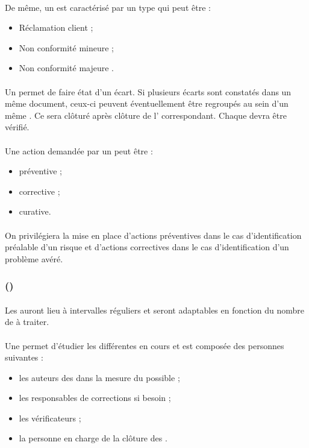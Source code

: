 \paragraph*{} De même, un \FTCourt{} est caractérisé par un type qui peut être :
\begin{itemize}
\item Réclamation client ;
\item Non conformité mineure ;
\item Non conformité majeure .
\end{itemize}

\paragraph*{} Un \FTCourt{} permet de faire état d'un écart. Si plusieurs écarts sont constatés dans un même
document, ceux-ci peuvent éventuellement être regroupés au sein d'un même \FTCourt . Ce \FTCourt{} sera
clôturé après clôture de l'\OCCourt{} correspondant. Chaque \OCCourt{} devra être vérifié.
\paragraph*{} Une action demandée par un \OCCourt{} peut être :
\begin{itemize}
\item préventive ;
\item corrective ;
\item curative.
\end{itemize}

\paragraph*{} On privilégiera la mise en place d'actions préventives dans le cas d'identification préalable
d'un risque et d'actions correctives dans le cas d'identification d'un problème avéré.


\subsubsection*{\CTFT (\CTFTCourt)}
\paragraph*{} Les \CTFTCourt{} auront lieu à intervalles réguliers et seront adaptables en fonction du nombre de \FTCourt{} à
traiter.

\paragraph*{} Une \CTFTCourt{} permet d'étudier les différentes \FTCourt{} en cours et est composée des personnes
suivantes :
\begin{itemize}
\item les auteurs des \FFTCourt{} dans la mesure du possible ;
\item les responsables de corrections si besoin ;
\item les vérificateurs ;
\item la personne en charge de la clôture des \OCCourt .
\end{itemize}

